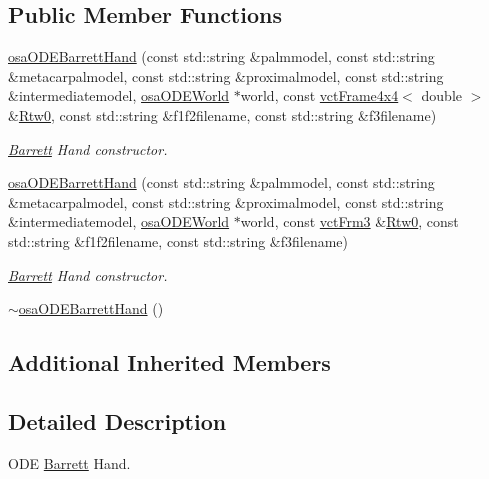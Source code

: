 \subsection*{Public Member Functions}
\begin{DoxyCompactItemize}
\item 
\hyperlink{classosa_o_d_e_barrett_hand_ae526bb3fca40d83bbc14b4f999186c47}{osa\+O\+D\+E\+Barrett\+Hand} (const std\+::string \&palmmodel, const std\+::string \&metacarpalmodel, const std\+::string \&proximalmodel, const std\+::string \&intermediatemodel, \hyperlink{classosa_o_d_e_world}{osa\+O\+D\+E\+World} $\ast$world, const \hyperlink{classvct_frame4x4}{vct\+Frame4x4}$<$ double $>$ \&\hyperlink{classrob_manipulator_ab48d9d9a166bf252698bc35788ca6ad6}{Rtw0}, const std\+::string \&f1f2filename, const std\+::string \&f3filename)
\begin{DoxyCompactList}\small\item\em \hyperlink{struct_barrett}{Barrett} Hand constructor. \end{DoxyCompactList}\item 
\hyperlink{classosa_o_d_e_barrett_hand_a79240e785e4b44d74f789513e1f90678}{osa\+O\+D\+E\+Barrett\+Hand} (const std\+::string \&palmmodel, const std\+::string \&metacarpalmodel, const std\+::string \&proximalmodel, const std\+::string \&intermediatemodel, \hyperlink{classosa_o_d_e_world}{osa\+O\+D\+E\+World} $\ast$world, const \hyperlink{vct_transformation_types_8h_a81feda0a02c2d1bc26e5553f409fed20}{vct\+Frm3} \&\hyperlink{classrob_manipulator_ab48d9d9a166bf252698bc35788ca6ad6}{Rtw0}, const std\+::string \&f1f2filename, const std\+::string \&f3filename)
\begin{DoxyCompactList}\small\item\em \hyperlink{struct_barrett}{Barrett} Hand constructor. \end{DoxyCompactList}\item 
\hyperlink{classosa_o_d_e_barrett_hand_acd1a9835c1ce44d9944927f6ca045714}{$\sim$osa\+O\+D\+E\+Barrett\+Hand} ()
\end{DoxyCompactItemize}
\subsection*{Additional Inherited Members}


\subsection{Detailed Description}
O\+D\+E \hyperlink{struct_barrett}{Barrett} Hand. 

